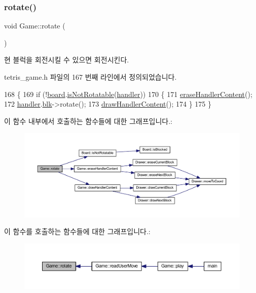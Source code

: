 \subsubsection{\texorpdfstring{rotate()}{rotate()}}
{\footnotesize\ttfamily void Game\+::rotate (\begin{DoxyParamCaption}{ }\end{DoxyParamCaption})\hspace{0.3cm}{\ttfamily [inline]}}



현 블럭을 회전시킬 수 있으면 회전시킨다. 



tetris\+\_\+game.\+h 파일의 167 번째 라인에서 정의되었습니다.


\begin{DoxyCode}
168     \{
169         \textcolor{keywordflow}{if} (!\mbox{\hyperlink{class_game_af5bc546b0c766ecf2f7e008f750832ed}{board}}.\mbox{\hyperlink{class_board_a4b84310dd1ac3a08a3180361508a43e3}{isNotRotatable}}(\mbox{\hyperlink{class_game_ae72b7259125e83dfd258c6a132394eec}{handler}}))
170         \{
171             \mbox{\hyperlink{class_game_a7ab3d17dc7bf72f0a59fbb7b17c6ce5a}{eraseHandlerContent}}();
172             \mbox{\hyperlink{class_game_ae72b7259125e83dfd258c6a132394eec}{handler}}.\mbox{\hyperlink{class_block_handler_ab57212ded2552ab5559d278c8538c454}{blk}}->rotate();
173             \mbox{\hyperlink{class_game_aa61075838d60bc5c850b72bc4804b7b8}{drawHandlerContent}}();
174         \}
175     \}
\end{DoxyCode}
이 함수 내부에서 호출하는 함수들에 대한 그래프입니다.\+:
\nopagebreak
\begin{figure}[H]
\begin{center}
\leavevmode
\includegraphics[width=350pt]{class_game_a8727c9c167265bff376f606d02687c6b_cgraph}
\end{center}
\end{figure}
이 함수를 호출하는 함수들에 대한 그래프입니다.\+:
\nopagebreak
\begin{figure}[H]
\begin{center}
\leavevmode
\includegraphics[width=350pt]{class_game_a8727c9c167265bff376f606d02687c6b_icgraph}
\end{center}
\end{figure}


